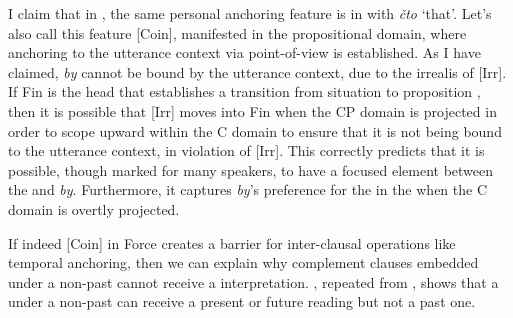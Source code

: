 \documentclass[output=paper,modfonts,newtxmath,hidelinks,]{langscibook}
\begin{document}
I claim that in , the same personal anchoring feature is in  with \textit{čto} `that'. Let’s also call this feature [Coin], manifested in the propositional domain, where anchoring to the utterance context via point-of-view is established. As I have claimed, \textit{by} cannot be bound by the utterance context, due to the irrealis  of [Irr]. If Fin is the head that establishes a transition from situation to proposition \citep{RamchandSvenonius2014}, then it is possible that [Irr] moves into Fin when the CP domain is projected in order to scope upward within the C domain to ensure that it is not being bound to the utterance context, in violation of [Irr]. This correctly predicts that it is possible, though marked for many speakers, to have a focused element between the  and \textit{by}. Furthermore, it captures \textit{by}’s preference for the  in the  when the C domain is overtly projected. 

If indeed [Coin] in Force creates a barrier for inter-clausal operations like temporal anchoring, then we can explain why  complement clauses embedded under a non-past  cannot receive a  interpretation. , repeated from , shows that a    under a non-past  can receive a present or future reading but not a past one.

\ea \label{10:ex33}
    \hfill \citep[8]{Asarina2006}
	\z
\z
\end{document}
